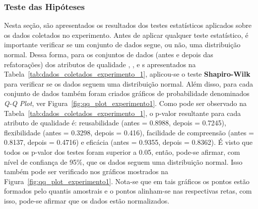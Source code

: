 \subsubsection{Teste das Hipóteses}

Nesta seção, são apresentados os resultados dos testes estatísticos aplicados sobre os dados coletados no experimento. Antes de aplicar qualquer teste estatístico, é importante verificar se um conjunto de dados segue, ou não, uma distribuição normal. Dessa forma, para os conjuntos de dados (antes e depois das refatorações) dos atributos de qualidade , ,  e s apresentados na Tabela~\ref{tab:dados_coletados_experimento_1}, aplicou-se o teste \textbf{Shapiro-Wilk} para verificar se os dados seguem uma distribuição normal. Além disso, para cada conjunto de dados também foram criados gráficos de probabilidade denominados \textit{Q-Q Plot}, ver Figura~\ref{fig:qq_plot_experimento1}. Como pode ser observado na Tabela~\ref{tab:dados_coletados_experimento_1}, o p-valor resultante para cada atributo de qualidade é: reusabilidade (antes = 0.8988, depois = 0.7245), flexibilidade (antes = 0.3298, depois = 0.416), facilidade de compreensão (antes = 0.8137, depois = 0.4716) e eficácia (antes = 0.9355, depois = 0.8362). É visto que todos os p-valor dos testes foram superior a 0.05, então, pode-se afirmar, com nível de confiança de 95\%, que os dados seguem uma distribuição normal. Isso também pode ser verificado nos gráficos mostrados na Figura~\ref{fig:qq_plot_experimento1}. Nota-se que em tais gráficos os pontos estão formados pelo quantis amostrais e o pontos alinham-se nas respectivas retas, com isso, pode-se afirmar que os dados estão normalizados.

